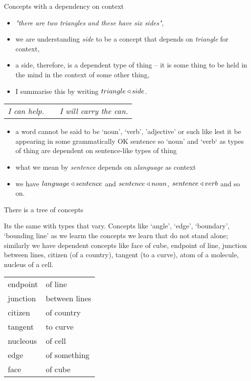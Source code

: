 
\begin{frame}{Concepts with a dependency on context}
\begin{center}
\raisebox{-0.5cm}{
\pspicture(0,-0.1)(1.1,1)
\psline(0,0)(0,1)(1,1)(1,0)(0,0)
\psline (0,0)(1,1)
\endpspicture
}
\end{center}
\begin{itemize}
\item \textit{"there are two triangles and these have six sides"}, 
\item  we are understanding \textit{side} to be a concept that 
depends on \textit{triangle} for context,
\item a side, therefore, is a dependent type of thing -- it is some thing to be held in the mind
in the context of some other thing,
\item I summarise this by writing $triangle \triangleleft side$.
\end{itemize}
\end{frame}


\begin{frame}
\begin{tabular}{c p{2cm} c }
\textit{I can help.} & &\textit{I will carry the can.}
\end{tabular}
\begin{itemize}
\item a word cannot be said to be `noun', `verb', 'adjective' or such like lest it be appearing in some grammatically OK sentence so `noun' and `verb` as types of thing are dependent on sentence-like types of thing
\item what we mean by \textit{sentence} depends on a\textit{language} as context
\item we have $language \triangleleft sentence$ and $sentence \triangleleft noun$, $sentence \triangleleft verb$ and so on.
\end{itemize}
There is a tree of concepts

\end{frame}

\begin{frame}
Its the same with types that vary. 
Concepts like `angle', `edge', `boundary', `bounding line' as we learm the concepts
we learn that do not stand alone; similarly
we have dependent concepts like  face of cube,  endpoint of line,   junction between lines, citizen (of a country), tangent (to a curve), atom of a molecule,  nucleus of a cell. 
\begin{tabular}{l l}
endpoint & of line\\
junction & between lines\\
citizen & of country\\
tangent & to curve\\
nucleous & of cell \\
edge & of something \\
face & of cube\\
\end{tabular}
\end{frame}

